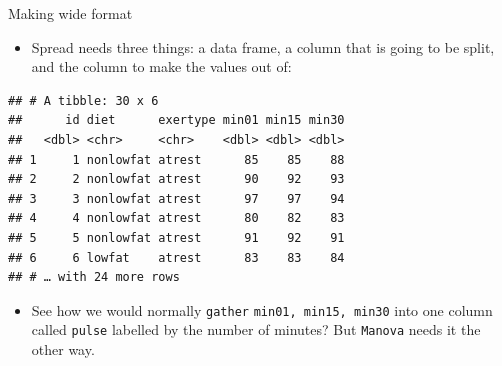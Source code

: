\documentclass[ignorenonframetext,]{beamer}
\newenvironment{Shaded}{\begin{snugshade}}{\end{snugshade}}
\newcommand{\DataTypeTok}[1]{\textcolor[rgb]{0.13,0.29,0.53}{#1}}
\newcommand{\DecValTok}[1]{\textcolor[rgb]{0.00,0.00,0.81}{#1}}
\newcommand{\KeywordTok}[1]{\textcolor[rgb]{0.13,0.29,0.53}{\textbf{#1}}}
\newcommand{\NormalTok}[1]{#1}
\newcommand{\OperatorTok}[1]{\textcolor[rgb]{0.81,0.36,0.00}{\textbf{#1}}}
\newcommand{\StringTok}[1]{\textcolor[rgb]{0.31,0.60,0.02}{#1}}
\providecommand{\tightlist}{%
  \setlength{\itemsep}{0pt}\setlength{\parskip}{0pt}}
\begin{document}
\begin{frame}[fragile]{Making wide format}
\protect\hypertarget{making-wide-format}{}

\begin{itemize}
\tightlist
\item
  Spread needs three things: a data frame, a column that is going to be
  split, and the column to make the values out of:
\end{itemize}

\begin{Shaded}
\end{Shaded}

\begin{verbatim}
## # A tibble: 30 x 6
##      id diet      exertype min01 min15 min30
##   <dbl> <chr>     <chr>    <dbl> <dbl> <dbl>
## 1     1 nonlowfat atrest      85    85    88
## 2     2 nonlowfat atrest      90    92    93
## 3     3 nonlowfat atrest      97    97    94
## 4     4 nonlowfat atrest      80    82    83
## 5     5 nonlowfat atrest      91    92    91
## 6     6 lowfat    atrest      83    83    84
## # … with 24 more rows
\end{verbatim}

\begin{itemize}
\tightlist
\item
  See how we would normally \texttt{gather} \texttt{min01, min15,
  min30} into one column called \texttt{pulse} labelled by the number of
  minutes? But \texttt{Manova} needs it the other way.
\end{itemize}

\end{frame}
\end{document}
